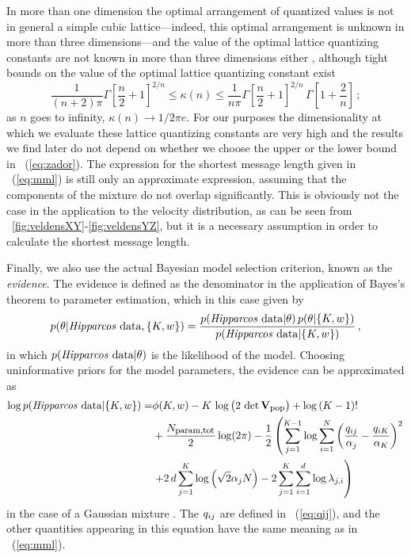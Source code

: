 In more than one dimension the optimal arrangement of quantized values
is not in general a simple cubic lattice---indeed, this optimal
arrangement is unknown in more than three dimensions---and the value of
the optimal lattice quantizing constants are not known in more than
three dimensions either \citep{conway92a}, although tight bounds on
the value of the optimal lattice quantizing constant exist
\citep{zador63,zador82}
\begin{equation}\label{eq:zador}
\frac{1}{(n+2)\pi} \Gamma\left[\frac{n}{2}+1\right]^{2/n} \leq
\kappa(n) \leq \frac{1}{n\pi} \Gamma\left[\frac{n}{2}+1\right]^{2/n}\,
\Gamma\left[1+\frac{2}{n}\right]\, ;
\end{equation}
as $n$ goes to infinity, $\kappa(n) \rightarrow 1/2\pi e$. For our
purposes the dimensionality at which we evaluate these lattice
quantizing constants are very high and the results we find later do
not depend on whether we choose the upper or the lower bound in
\eqnnumber~(\ref{eq:zador}). The expression for the shortest message
length given in \eqnnumber~(\ref{eq:mml}) is still only an approximate
expression, assuming that the components of the mixture do not overlap
significantly. This is obviously not the case in the application to
the velocity distribution, as can be seen from
\figuresname~\ref{fig:veldensXY}-\ref{fig:veldensYZ}, but it is a
necessary assumption in order to calculate the shortest message
length.

Finally, we also use the actual Bayesian model selection criterion,
known as the \emph{evidence}. The evidence is defined as the
denominator in the application of Bayes's theorem to parameter
estimation, which in this case given by
\begin{equation}\label{eq:bayes}
p(\theta | \mbox{\emph{Hipparcos}\ data}, \{K, w\}) = 
\frac{p(\mbox{\emph{Hipparcos}\ data} | \theta)\,
p(\theta|\{K,w\})}{p(\mbox{\emph{Hipparcos}\ data}|\{K,w\})}\, ,
\end{equation}
in which $p(\mbox{\emph{Hipparcos}\ data} | \theta)$ is the likelihood of
the model. Choosing uninformative priors for the model parameters, the
evidence can be approximated as
\begin{equation}
\begin{split}
\log p(\mbox{\emph{Hipparcos}\ data}|\{K,w\}) = &
\phi(K,w) - K\, \log\left(2\,\det \mathbf{V}_{\mbox{{\footnotesize pop}}}\right)
+\log \left(K-1\right)!\\ & +\frac{N_{\mbox{{\footnotesize param,tot}}}}{2}\log (2\pi)
-\frac{1}{2} \left(\sum_{j=1}^{K-1} \log\sum_{i=1}^N 
\left(\frac{q_{ij}}{\alpha_j}-\frac{q_{iK}}{\alpha_K}\right)^2\right. \\
&\left.+2\, d\sum_{j=1}^K\log \left(\sqrt{2} \alpha_j N\right)
-2 \sum_{j=1}^K \sum_{i=1}^d \log \lambda_{j,i}\right)
\end{split}
\end{equation}
in the case of a Gaussian mixture \citep{roberts98a}. The $q_{ij}$ are
defined in \eqnnumber~(\ref{eq:qij}), and the other quantities
appearing in this equation have the same meaning as in
\eqnnumber~(\ref{eq:mml}).

